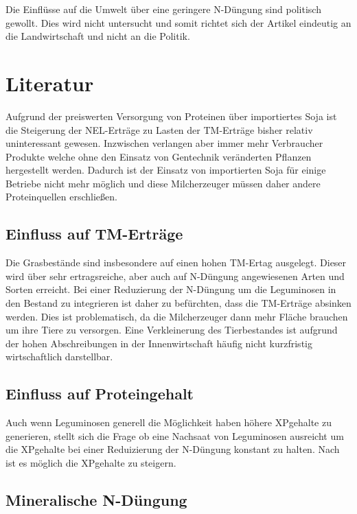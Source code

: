 \documentclass[12pt,titlepage]{scrartcl}
\begin{document}
Die Einflüsse auf die Umwelt über eine geringere N-Düngung sind politisch gewollt.
Dies wird nicht untersucht und somit richtet sich der Artikel eindeutig an die Landwirtschaft und nicht an die Politik.


\section{Literatur}
\label{sec:Literatur}

Aufgrund der preiswerten Versorgung von Proteinen über importiertes Soja ist die Steigerung der \ac{NEL}-Erträge zu Lasten der \ac{TM}-Erträge bisher relativ uninteressant gewesen.
Inzwischen verlangen aber immer mehr Verbraucher Produkte welche ohne den Einsatz von Gentechnik veränderten Pflanzen hergestellt werden.
Dadurch ist der Einsatz von importierten Soja für einige Betriebe nicht mehr möglich und diese Milcherzeuger müssen daher andere Proteinquellen erschließen.

\subsection{Einfluss auf TM-Erträge}
\label{subsec:TM}

Die Grasbestände sind insbesondere auf einen hohen \ac{TM}-Ertag ausgelegt.
Dieser wird über sehr ertragsreiche, aber auch auf N-Düngung angewiesenen Arten und Sorten erreicht.
Bei einer Reduzierung der N-Düngung um die Leguminosen in den Bestand zu integrieren ist daher zu befürchten, dass die \ac{TM}-Erträge absinken werden.
Dies ist problematisch, da die Milcherzeuger dann mehr Fläche brauchen um ihre Tiere zu versorgen.
Eine Verkleinerung des Tierbestandes ist aufgrund der hohen Abschreibungen in der Innenwirtschaft häufig nicht kurzfristig wirtschaftlich darstellbar.

\subsection{Einfluss auf Proteingehalt}
\label{subsec:Protein}

Auch wenn Leguminosen generell die Möglichkeit haben höhere \ac{XP}gehalte zu generieren, stellt sich die Frage ob eine Nachsaat von Leguminosen ausreicht um die \ac{XP}gehalte bei einer Reduizierung der N-Düngung konstant zu halten.
Nach \textcite[35]{weggler2050leguminosen} ist es möglich die \ac{XP}gehalte zu steigern.

\subsection{Mineralische N-Düngung}
\label{subsec:Lit:N-Düngung}
\end{document}
